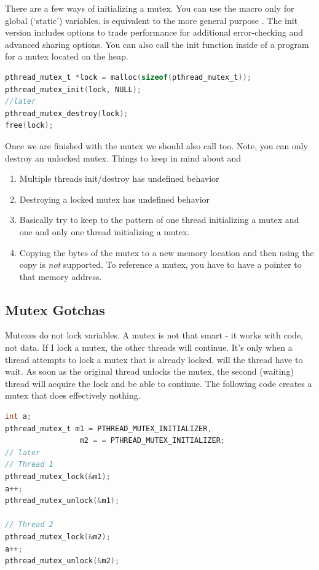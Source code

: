 There are a few ways of initializing a mutex.
You can use the macro  only for global (`static') variables.
 is equivalent to the more general purpose .
The init version includes options to trade performance for additional error-checking and advanced sharing options.
You can also call the init function inside of a program for a mutex located on the heap.

\begin{lstlisting}[language=C]
pthread_mutex_t *lock = malloc(sizeof(pthread_mutex_t)); 
pthread_mutex_init(lock, NULL);
//later
pthread_mutex_destroy(lock);
free(lock);
\end{lstlisting}

Once we are finished with the mutex we should also call  too.
Note, you can only destroy an unlocked mutex.
Things to keep in mind about  and 

\begin{enumerate} 
\item Multiple threads init/destroy has undefined behavior  
\item Destroying a locked mutex has undefined behavior  
\item Basically try to keep to the pattern of one thread initializing a mutex and one and only one thread initializing a mutex.
\item Copying the bytes of the mutex to a new memory location and then using the copy is \emph{not} supported. To reference a mutex, you have to have a pointer to that memory address.
\end{enumerate}

\subsection{Mutex Gotchas}

Mutexes do not lock variables.
A mutex is not that smart - it works with code, not data.
If I lock a mutex, the other threads will continue.
It's only when a thread attempts to lock a mutex that is already locked, will the thread have to wait.
As soon as the original thread unlocks the mutex, the second (waiting) thread will acquire the lock and be able to continue.
The following code creates a mutex that does effectively nothing.

\begin{lstlisting}[language=C]
int a;
pthread_mutex_t m1 = PTHREAD_MUTEX_INITIALIZER,
                 m2 = = PTHREAD_MUTEX_INITIALIZER;
// later
// Thread 1
pthread_mutex_lock(&m1);
a++;
pthread_mutex_unlock(&m1);

// Thread 2
pthread_mutex_lock(&m2);
a++;
pthread_mutex_unlock(&m2);
\end{lstlisting}

